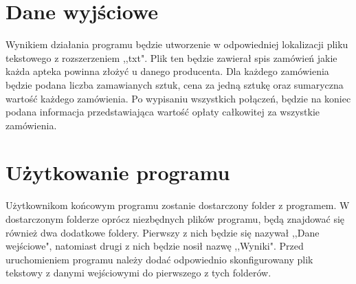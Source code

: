\documentclass[12pt]{article}
\begin{document}
\section{Dane wyjściowe}
\qquad Wynikiem działania programu będzie utworzenie w odpowiedniej lokalizacji pliku tekstowego z rozszerzeniem ,,txt". Plik ten będzie zawierał spis zamówień jakie każda apteka powinna złożyć u danego producenta. Dla każdego zamówienia będzie podana liczba zamawianych sztuk, cena za jedną sztukę oraz sumaryczna wartość każdego zamówienia. Po wypisaniu wszystkich połączeń, będzie na koniec podana informacja przedstawiająca wartość opłaty całkowitej za wszystkie zamówienia.

\section{Użytkowanie programu}
\qquad Użytkownikom końcowym programu zostanie dostarczony folder z programem. W dostarczonym folderze oprócz niezbędnych plików programu, będą znajdować się również dwa dodatkowe foldery. Pierwszy z nich będzie się nazywał ,,Dane wejściowe", natomiast drugi z nich będzie nosił nazwę ,,Wyniki". Przed uruchomieniem programu należy dodać odpowiednio skonfigurowany plik tekstowy z danymi wejściowymi do pierwszego z tych folderów. 
\end{document}
